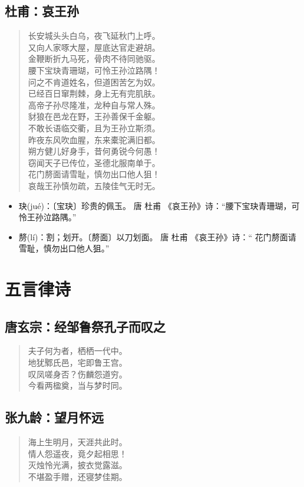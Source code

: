 \documentclass[12pt,oneside]{book}
\newenvironment{shici}{
\begin{verse}
\centering\large\hspace{12pt}}
{\end{verse}}
\begin{document}
\chapter{杜甫：哀王孙}
\begin{shici}
长安城头头白乌，夜飞延秋门上呼。\\
又向人家啄大屋，屋底达官走避胡。\\
金鞭断折九马死，骨肉不待同驰驱。\\
腰下宝玦青珊瑚，可怜王孙泣路隅！\\
问之不肯道姓名，但道困苦乞为奴。\\
已经百日窜荆棘，身上无有完肌肤。\\
高帝子孙尽隆准，龙种自与常人殊。\\
豺狼在邑龙在野，王孙善保千金躯。\\
不敢长语临交衢，且为王孙立斯须。\\
昨夜东风吹血腥，东来橐驼满旧都。\\
朔方健儿好身手，昔何勇锐今何愚！\\
窃闻天子已传位，圣德北服南单于。\\
花门剺面请雪耻，慎勿出口他人狙！\\
哀哉王孙慎勿疏，五陵佳气无时无。
\end{shici}

\begin{itemize}
\item 玦(jué)：〔宝玦〕珍贵的佩玉。  唐 杜甫 《哀王孙》诗：“腰下宝玦青珊瑚，可怜王孙泣路隅。” 
\item 剺(lí)：割；划开。〔剺面〕以刀划面。 唐 杜甫 《哀王孙》诗：“ 花门剺面请雪耻，慎勿出口他人狙。”  
\end{itemize}


\part{五言律诗}
\chapter{唐玄宗：经邹鲁祭孔子而叹之}
\begin{shici}
夫子何为者，栖栖一代中。\\
地犹鄹氏邑，宅即鲁王宫。\\
叹凤嗟身否？伤麟怨道穷。\\
今看两楹奠，当与梦时同。
\end{shici}

\chapter{张九龄：望月怀远}
\begin{shici}
海上生明月，天涯共此时。\\
情人怨遥夜，竟夕起相思！\\
灭烛怜光满，披衣觉露滋。\\
不堪盈手赠，还寝梦佳期。
\end{shici}
\end{document}
